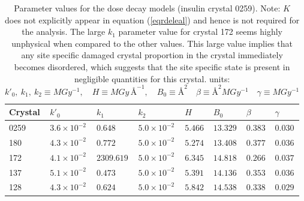 \begin{table}[H]
\small
\captionsetup{justification=centering}
	\caption{Parameter values for the dose decay models (insulin crystal 0259).
	Note: $K$ does not explicitly appear in equation (\ref{eqrdeleal}) and hence is not required for the analysis.
	The large $k_1$ parameter value for crystal 172 seems highly unphysical when compared to the other values.
	This large value implies that any site specific damaged crystal proportion in the crystal immediately becomes disordered, which suggests that the site specific state is present in negligible quantities for this crystal.
	\newline
	units: $k'_0,\ k_1,\ k_2 \equiv MGy^{-1}, \quad H \equiv MGy\,\text{\AA}^{-1}, \quad B_0 \equiv \text{\AA}^2 \quad \beta \equiv \text{\AA}^2 MGy^{-1} \quad \gamma \equiv MGy^{-1}$}
	\centering
	\begin{tabular}{p{1.6cm} p{1.6cm} p{1.6cm} p{1.6cm} p{1.2cm} p{1.2cm} p{1.2cm} p{1.2cm}}
		\hline
		Crystal	&$k'_0$	& $k_1$	&$k_2$ &$H$	 &$B_0$	&$\beta$	&$\gamma$	\\
		\hline
		0259     &$3.6 \times 10^{-2}$   &$0.648$   	&$5.0 \times 10^{-2}$   &$5.466$    &$13.329$    &$0.383$  &$0.030$ \\
	  180      &$4.3 \times 10^{-2}$   &$0.772$   	&$5.0 \times 10^{-2}$   &$5.274$    &$13.408$    &$0.377$  &$0.036$ \\
		172      &$4.1 \times 10^{-2}$   &$2309.619$  &$5.0 \times 10^{-2}$   &$6.345$    &$14.818$    &$0.266$  &$0.037$ \\
	  137      &$5.1 \times 10^{-2}$   &$0.473$   	&$5.0 \times 10^{-2}$   &$5.391$    &$14.136$    &$0.353$  &$0.036$ \\
		128      &$4.3 \times 10^{-2}$   &$0.624$   	&$5.0 \times 10^{-2}$   &$5.842$    &$14.538$    &$0.338$  &$0.029$ \\
		\hline
	\end{tabular}
	\label{tab:RDE params1}
\end{table}

